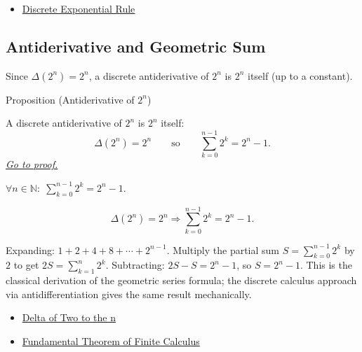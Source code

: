 \begin{dependencies}
\begin{itemize}
  \item \hyperref[prop:discrete-exponential-rule]{Discrete Exponential Rule}
\end{itemize}
\end{dependencies}

\subsection*{Antiderivative and Geometric Sum}

\begin{exposition}
Since \(\Delta(2^n) = 2^n\), a discrete antiderivative of \(2^n\) is \(2^n\)
itself (up to a constant).
\end{exposition}

\begin{propositionbox}{Proposition (Antiderivative of \(2^n\))}
\begin{proposition}[Antiderivative of \(2^n\)]
\label{prop:antideriv-two-n}
A discrete antiderivative of \(2^n\) is \(2^n\) itself:
\[
\Delta(2^n) = 2^n
\qquad \text{so} \qquad
\sum_{k=0}^{n-1} 2^k = 2^n - 1.
\]
\hyperref[prf:antideriv-two-n]{\textit{Go to proof.}}
\end{proposition}
\end{propositionbox}

\begin{remark*}
\(\forall n \in \mathbb{N}:\;
\displaystyle\sum_{k=0}^{n-1} 2^k = 2^n - 1\).
\end{remark*}

\begin{remark*}
\[
\Delta(2^n)=2^n\Longrightarrow \sum_{k=0}^{n-1}2^k=2^n-1.
\]
\end{remark*}

\begin{remark*}[Interpretation]
Expanding: \(1 + 2 + 4 + 8 + \cdots + 2^{n-1}\). Multiply the partial sum
\(S = \sum_{k=0}^{n-1}2^k\) by \(2\) to get \(2S = \sum_{k=1}^{n}2^k\).
Subtracting: \(2S - S = 2^n - 1\), so \(S = 2^n - 1\). This is the
classical derivation of the geometric series formula; the discrete calculus
approach via antidifferentiation gives the same result mechanically.
\end{remark*}

\begin{dependencies}
\begin{itemize}
  \item \hyperref[prop:delta-two-n]{Delta of Two to the n}
  \item \hyperref[thm:fundamental-theorem-finite-calculus]{Fundamental Theorem of Finite Calculus}
\end{itemize}
\end{dependencies}

